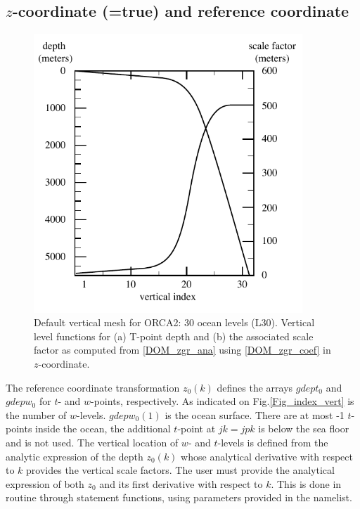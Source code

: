 {\subsection[$z$-coordinate (\np{ln\_zco}]
	  	  {$z$-coordinate (=true) and reference coordinate}
\label{DOM_zco}

\begin{figure}[!tb]    \begin{center}
\includegraphics[width=0.90\textwidth]{./TexFiles/Figures/Fig_zgr.pdf}
\caption{ \label{Fig_zgr}    
Default vertical mesh for ORCA2: 30 ocean levels (L30). Vertical level functions for 
(a) T-point depth and (b) the associated scale factor as computed 
from \eqref{DOM_zgr_ana} using \eqref{DOM_zgr_coef} in $z$-coordinate.}
\end{center}   \end{figure}

The reference coordinate transformation $z_0 (k)$ defines the arrays $gdept_0$ 
and $gdepw_0$ for $t$- and $w$-points, respectively. As indicated on 
Fig.\ref{Fig_index_vert}  is the number of $w$-levels. $gdepw_0(1)$ is the 
ocean surface. There are at most -1 $t$-points inside the ocean, the 
additional $t$-point at $jk=jpk$ is below the sea floor and is not used. 
The vertical location of $w$- and $t$-levels is defined from the analytic expression 
of the depth $z_0(k)$ whose analytical derivative with respect to $k$ provides the 
vertical scale factors. The user must provide the analytical expression of both 
$z_0$ and its first derivative with respect to $k$. This is done in routine  
through statement functions, using parameters provided in the  namelist. 

}
